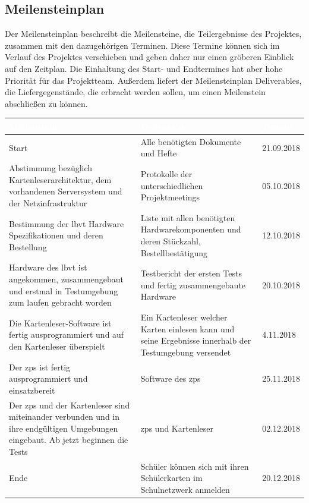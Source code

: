 \newpage
\subsection{Meilensteinplan}
Der Meilensteinplan beschreibt die Meilensteine, die Teilergebnisse des Projektes, zusammen mit den dazugehörigen Terminen. Diese Termine können sich im Verlauf des Projektes verschieben und geben daher nur einen gröberen Einblick auf den Zeitplan. Die Einhaltung des Start- und Endtermines hat aber hohe Priorität für das Projektteam. Außerdem liefert der Meilensteinplan Deliverables, die Liefergegenstände, die erbracht werden sollen, um einen Meilenstein abschließen zu können. 
\begin{footnotesize}
\begin{center}
    \begin{tabularx}{\textwidth}{| p{4cm} | p{7.5cm} | X |}
        \hline \rowcolor{gray} \textbf{\textcolor{white}{Meilenstein}} & \textbf{\textcolor{white}{Deliverable}} & \textbf{\textcolor{white}{Termin}}\\
        \hline \hline
        Start & Alle benötigten Dokumente und Hefte & 21.09.2018 \\
        \hline
        Abstimmung bezüglich Kartenleserarchitektur, dem vorhandenen Serversystem und der Netzinfrastruktur & Protokolle der unterschiedlichen Projektmeetings & 05.10.2018 \\
        \hline
        Bestimmung der \gls{lbvt} Hardware Spezifikationen und deren Bestellung & Liste mit allen benötigten Hardwarekomponenten und deren Stückzahl, Bestellbestätigung & 12.10.2018 \\
        \hline
        Hardware des \gls{lbvt} ist angekommen, zusammengebaut und erstmal in Testumgebung zum laufen gebracht worden & Testbericht der ersten Tests und fertig zusammengebaute Hardware & 20.10.2018 \\
        \hline
        Die Kartenleser-Software ist fertig ausprogrammiert und auf den Kartenleser überspielt & Ein Kartenleser welcher Karten einlesen kann und seine Ergebnisse innerhalb der Testumgebung versendet & 4.11.2018 \\
        \hline
        Der \gls{zps} ist fertig ausprogrammiert und einsatzbereit & Software des \gls{zps} & 25.11.2018 \\
        \hline
        Der \gls{zps} und der Kartenleser sind miteinander verbunden und in ihre endgültigen Umgebungen eingebaut. Ab jetzt beginnen die Tests & \gls{zps} und Kartenleser & 02.12.2018 \\
        \hline
        Ende & Schüler können sich mit ihren Schülerkarten im Schulnetzwerk anmelden & 20.12.2018 \\
        \hline
    \end{tabularx}
\end{center}
\end{footnotesize}

